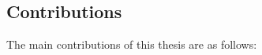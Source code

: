 \subsection{Contributions}
\noindent
The main contributions of this thesis are as follows:


        
    
    
    


